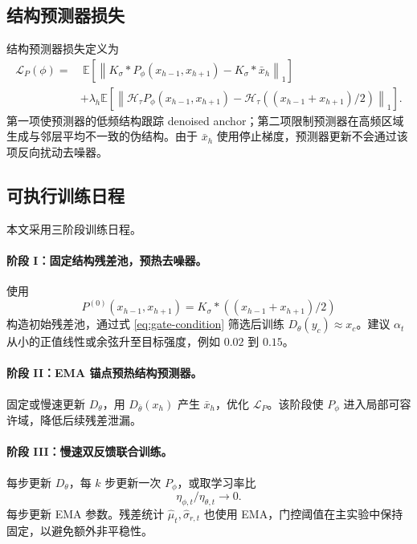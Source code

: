 \documentclass[11pt,a4paper,UTF8,fontset=fandol]{ctexart}
\theoremstyle{definition}
\newcommand{\norm}[1]{\left\lVert#1\right\rVert}
\newcommand{\E}{\mathbb{E}}
\newcommand{\cL}{\mathcal{L}}
\newcommand{\cH}{\mathcal{H}}
\begin{document}
\subsection{结构预测器损失}

结构预测器损失定义为
\begin{equation}
\label{eq:LP-def}
\begin{aligned}
\cL_P(\phi)
=&\ \E\left[
    \norm{K_\sigma*P_\phi(x_{h-1},x_{h+1})-K_\sigma*\bar x_h}_1
\right]\\
&+\lambda_h\E\left[
    \norm{\cH_\tau P_\phi(x_{h-1},x_{h+1})
    -\cH_\tau\left((x_{h-1}+x_{h+1})/2\right)}_1
\right].
\end{aligned}
\end{equation}
第一项使预测器的低频结构跟踪 denoised anchor；第二项限制预测器在高频区域生成与邻层平均不一致的伪结构。由于 $\bar x_h$ 使用停止梯度，预测器更新不会通过该项反向扰动去噪器。

\subsection{可执行训练日程}

本文采用三阶段训练日程。

\paragraph{阶段 I：固定结构残差池，预热去噪器。}
使用
\begin{equation}
    P^{(0)}(x_{h-1},x_{h+1})=
    K_\sigma*\left((x_{h-1}+x_{h+1})/2\right)
\end{equation}
构造初始残差池，通过式 \eqref{eq:gate-condition} 筛选后训练 $D_\theta(y_c)\approx x_c$。建议 $\alpha_t$ 从小的正值线性或余弦升至目标强度，例如 $0.02$ 到 $0.15$。

\paragraph{阶段 II：EMA 锚点预热结构预测器。}
固定或慢速更新 $D_\theta$，用 $D_{\bar\theta}(x_h)$ 产生 $\bar x_h$，优化 $\cL_P$。该阶段使 $P_\phi$ 进入局部可容许域，降低后续残差泄漏。

\paragraph{阶段 III：慢速双反馈联合训练。}
每步更新 $D_\theta$，每 $k$ 步更新一次 $P_\phi$，或取学习率比
\begin{equation}
    \eta_{\phi,t}/\eta_{\theta,t}\to0.
\end{equation}
每步更新 EMA 参数。残差统计 $\hat\mu_t,\hat\sigma_{r,t}$ 也使用 EMA，门控阈值在主实验中保持固定，以避免额外非平稳性。
\end{document}
